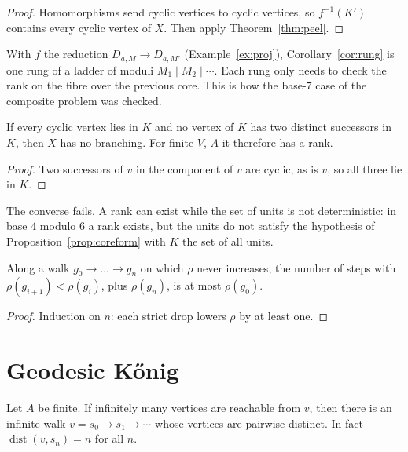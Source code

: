 \begin{proof}
Homomorphisms send cyclic vertices to cyclic vertices, so \(f^{-1}(K')\) contains every cyclic
vertex of \(X\). Then apply Theorem~\ref{thm:peel}.
\end{proof}

With \(f\) the reduction \(D_{a,M}\to D_{a,M'}\) (Example~\ref{ex:proj}),
Corollary~\ref{cor:rung} is one rung of a ladder of moduli \(M_1\mid M_2\mid\cdots\). Each rung
only needs to check the rank on the fibre over the previous core. This is how the base-\(7\)
case of the composite problem was checked.

\begin{proposition}\label{prop:coreform}
If every cyclic vertex lies in \(K\) and no vertex of \(K\) has two distinct successors in \(K\),
then \(X\) has no branching. For finite \(V\), \(A\) it therefore has a rank.
\end{proposition}

\begin{proof}
Two successors of \(v\) in the component of \(v\) are cyclic, as is \(v\), so all three lie
in \(K\).
\end{proof}

The converse fails. A rank can exist while the set of units is not deterministic: in base
\(4\) modulo \(6\) a rank exists, but the units do not satisfy the hypothesis of
Proposition~\ref{prop:coreform} with \(K\) the set of all units.

\begin{proposition}\label{prop:depth}
Along a walk \(g_0\to\dots\to g_n\) on which \(\rho\) never increases, the number of steps with
\(\rho(g_{i+1})<\rho(g_i)\), plus \(\rho(g_n)\), is at most \(\rho(g_0)\).
\end{proposition}

\begin{proof}
Induction on \(n\): each strict drop lowers \(\rho\) by at least one.
\end{proof}

\section{Geodesic Kőnig}

\begin{theorem}\label{thm:geodesic-konig}
Let \(A\) be finite. If infinitely many vertices are reachable from \(v\), then there is an
infinite walk \(v=s_0\to s_1\to\cdots\) whose vertices are pairwise distinct. In fact
\(\operatorname{dist}(v,s_n)=n\) for all \(n\).
\end{theorem}

